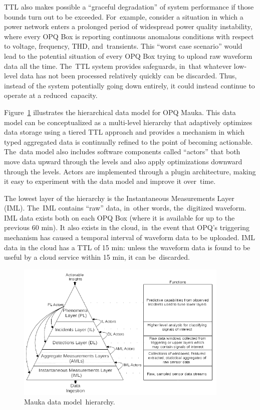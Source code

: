 \documentclass[energies,article,accept,moreauthors,pdftex]{Definitions/mdpi}
\begin{document}
TTL also makes possible a ``graceful degradation'' of system performance if those bounds turn out to be exceeded. For~example, consider a situation in which a power network enters a prolonged period of widespread power quality instability, where every OPQ Box is reporting continuous anomalous conditions with respect to voltage, frequency, THD, and~transients. This ``worst case scenario'' would lead to the potential situation of every OPQ Box trying to upload raw waveform data all the time. The~TTL system provides safeguards, in~that whatever low-level data has not been processed relatively quickly can be discarded. Thus, instead of the system potentially going down entirely, it could instead continue to operate at a reduced~capacity.

Figure~\ref{fig:mauka-data-model} illustrates the hierarchical data model for OPQ Mauka. This data model can be conceptualized as a multi-level hierarchy that adaptively optimizes data storage using a tiered TTL approach and provides a mechanism in which typed aggregated data is continually refined to the point of becoming actionable. The~data model also includes software components called ``actors'' that both move data upward through the levels and also apply optimizations downward through the levels. Actors are implemented through a plugin architecture, making it easy to experiment with the data model and improve it over~time.



The lowest layer of the hierarchy is the Instantaneous Measurements Layer (IML). The~IML contains “raw” data, in~other words, the~digitized waveform. IML data exists both on each OPQ Box (where it is available for up to the previous 60 min). It also exists in the cloud, in~the event that OPQ's triggering mechanism has caused a temporal interval of waveform data to be uploaded. IML data in the cloud has a TTL of 15 min: unless the waveform data is found to be useful by a cloud service within 15 min, it can be~discarded.


\begin{figure}[H]
\center \includegraphics[width=4in]{images/mauka/mauka-data-model.png}
\caption{Mauka data model~hierarchy.}
\label{fig:mauka-data-model}
\end{figure}
\end{document}
